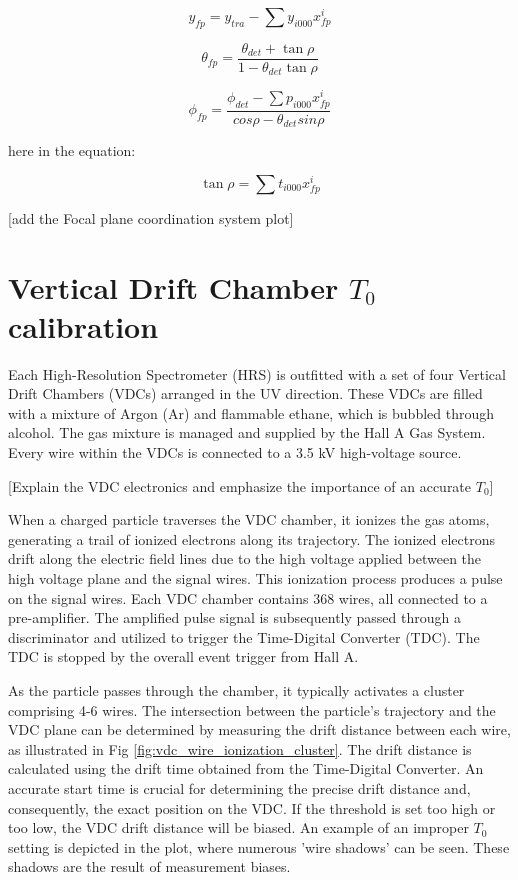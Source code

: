 \begin{equation}
    y_{fp} = y_{tra} - \sum y_{i000}x^i_{fp}  
\end{equation}

\begin{equation}
\theta_{fp} = \frac{\theta_{det} + \tan\rho}{1 - \theta_{det}\tan\rho}
\end{equation}


\begin{equation}
    \phi_{fp} = \frac{\phi_{det} - \sum p_{i000}x^i_{fp}}{cos \rho - \theta_{det} sin\rho}
\end{equation}

here  in the equation:

\begin{equation}
    \tan\rho  = \sum t_{i000}x^i_{fp} \label{eq:cpt3_fps_5}
\end{equation}

[add the Focal plane coordination system plot]


\section{Vertical Drift Chamber $T_0$ calibration}

Each High-Resolution Spectrometer (HRS) is outfitted with a set of four Vertical Drift Chambers (VDCs) arranged in the UV direction. These VDCs are filled with a mixture of Argon (Ar) and flammable ethane, which is bubbled through alcohol. The gas mixture is managed and supplied by the Hall A Gas System. Every wire within the VDCs is connected to a 3.5 kV high-voltage source.

[Explain the VDC electronics and emphasize the importance of an accurate $T_0$]

When a charged particle traverses the VDC chamber, it ionizes the gas atoms, generating a trail of ionized electrons along its trajectory. The ionized electrons drift along the electric field lines due to the high voltage applied between the high voltage plane and the signal wires. This ionization process produces a pulse on the signal wires. Each VDC chamber contains 368 wires, all connected to a pre-amplifier. The amplified pulse signal is subsequently passed through a discriminator and utilized to trigger the Time-Digital Converter (TDC). The TDC is stopped by the overall event trigger from Hall A.

As the particle passes through the chamber, it typically activates a cluster comprising 4-6 wires. The intersection between the particle's trajectory and the VDC plane can be determined by measuring the drift distance between each wire, as illustrated in Fig \ref{fig:vdc_wire_ionization_cluster}. The drift distance is calculated using the drift time obtained from the Time-Digital Converter. An accurate start time is crucial for determining the precise drift distance and, consequently, the exact position on the VDC. If the threshold is set too high or too low, the VDC drift distance will be biased. An example of an improper $T_0$ setting is depicted in the plot, where numerous 'wire shadows' can be seen. These shadows are the result of measurement biases. 


